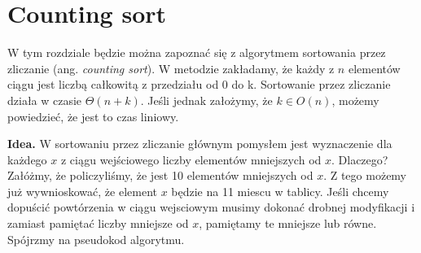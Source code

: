 \section{Counting sort}

\label{sec:countingsort}

W tym rozdziale będzie można zapoznać się z algorytmem sortowania przez zliczanie (ang. \textit{counting sort}). 
W metodzie zakładamy, że każdy z $n$ elementów ciągu jest liczbą całkowitą z przedziału od 0 do k.
Sortowanie przez zliczanie działa w czasie $\Theta(n+k)$.
Jeśli jednak założymy, że $k \in O(n)$, możemy powiedzieć, że jest to czas liniowy.

\textbf{Idea.} W sortowaniu przez zliczanie głównym pomysłem jest wyznaczenie dla każdego $x$ z ciągu wejściowego liczby elementów mniejszych od $x$.
Dlaczego?
Załóżmy, że policzyliśmy, że jest 10 elementów mniejszych od $x$.
Z tego możemy już wywnioskować, że element $x$ będzie na 11 miescu w tablicy.
Jeśli chcemy dopuścić powtórzenia w ciągu wejsciowym musimy dokonać drobnej modyfikacji i zamiast pamiętać liczby mniejsze od $x$, pamiętamy te mniejsze lub równe.
Spójrzmy na pseudokod algorytmu.

